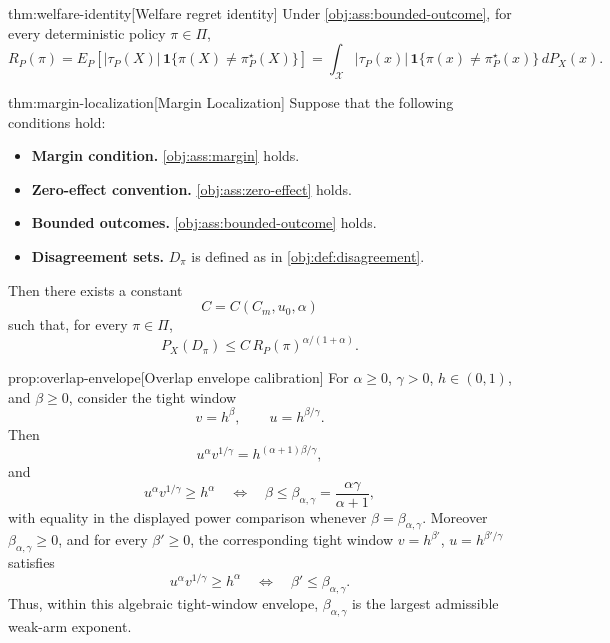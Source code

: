 \begin{theoremv}{thm:welfare-identity}[Welfare regret identity]
Under \cref{obj:ass:bounded-outcome}, for every deterministic policy \(\pi\in\Pi\),
\[
R_P(\pi)
=
E_P\!\left[
|\tau_P(X)|\,\mathbf 1\{\pi(X)\ne\pi^\star_P(X)\}
\right]
=
\int_{\mathcal X}
|\tau_P(x)|\,\mathbf 1\{\pi(x)\ne\pi^\star_P(x)\}\,dP_X(x).
\]
\end{theoremv}

\begin{theoremv}{thm:margin-localization}[Margin Localization]
Suppose that the following conditions hold:
\begin{itemize}
\item \textbf{Margin condition.} \cref{obj:ass:margin} holds.
\item \textbf{Zero-effect convention.} \cref{obj:ass:zero-effect} holds.
\item \textbf{Bounded outcomes.} \cref{obj:ass:bounded-outcome} holds.
\item \textbf{Disagreement sets.} \(D_\pi\) is defined as in \cref{obj:def:disagreement}.
\end{itemize}
Then there exists a constant
\[
C=C(C_m,u_0,\alpha)
\]
such that, for every \(\pi\in\Pi\),
\[
P_X(D_\pi)
\le
C\,R_P(\pi)^{\alpha/(1+\alpha)} .
\]
\end{theoremv}

\begin{propositionv}{prop:overlap-envelope}[Overlap envelope calibration]
For \(\alpha\ge0\), \(\gamma>0\), \(h\in(0,1)\), and \(\beta\ge0\), consider the tight window
\[
v=h^\beta,
\qquad
u=h^{\beta/\gamma}.
\]
Then
\[
u^\alpha v^{1/\gamma}
=
h^{(\alpha+1)\beta/\gamma},
\]
and
\[
u^\alpha v^{1/\gamma}\ge h^\alpha
\quad\Longleftrightarrow\quad
\beta\le \beta_{\alpha,\gamma}=\frac{\alpha\gamma}{\alpha+1},
\]
with equality in the displayed power comparison whenever \(\beta=\beta_{\alpha,\gamma}\). Moreover \(\beta_{\alpha,\gamma}\ge0\), and for every \(\beta'\ge0\), the corresponding tight window \(v=h^{\beta'}\), \(u=h^{\beta'/\gamma}\) satisfies
\[
u^\alpha v^{1/\gamma}\ge h^\alpha
\quad\Longleftrightarrow\quad
\beta'\le\beta_{\alpha,\gamma}.
\]
Thus, within this algebraic tight-window envelope, \(\beta_{\alpha,\gamma}\) is the largest admissible weak-arm exponent.
\end{propositionv}

